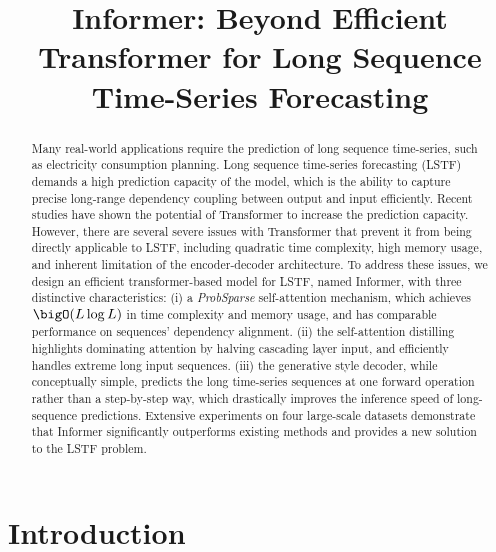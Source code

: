 \title{Informer: Beyond Efficient Transformer for Long Sequence \\ Time-Series Forecasting}



\maketitle

\begin{abstract}

Many real-world applications require the prediction of long sequence time-series, such as electricity consumption planning. Long sequence time-series forecasting (LSTF) demands a high prediction capacity of the model, which is the ability to capture precise long-range dependency coupling between output and input efficiently. Recent studies have shown the potential of Transformer to increase the prediction capacity. However, there are several severe issues with Transformer that prevent it from being directly applicable to LSTF, including quadratic time complexity, high memory usage, and inherent limitation of the encoder-decoder architecture. 
To address these issues, we design an efficient transformer-based model for LSTF, named Informer, with three distinctive characteristics: (i) a \emph{ProbSparse} self-attention mechanism, which achieves $\bigO(L \log L)$ in time complexity and memory usage, and has comparable performance on sequences' dependency alignment. (ii) the self-attention distilling highlights dominating attention by halving cascading layer input, and efficiently handles extreme long input sequences. (iii) the generative style decoder, while conceptually simple, predicts the long time-series sequences at one forward operation rather than a step-by-step way, which drastically improves the inference speed of long-sequence predictions. Extensive experiments on four large-scale datasets demonstrate that Informer significantly outperforms existing methods and provides a new solution to the LSTF problem.

\end{abstract}

\section{Introduction}

